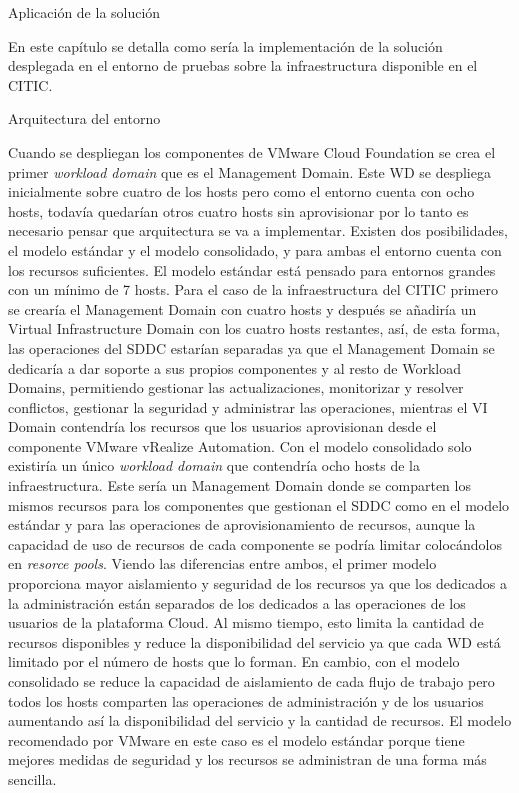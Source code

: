 \begin{chapter}{Aplicación de la solución}

En este capítulo se detalla como sería la implementación de la solución desplegada en el entorno de pruebas sobre la infraestructura disponible en el CITIC.

\begin{section}{Arquitectura del entorno}

Cuando se despliegan los componentes de VMware Cloud Foundation se crea el primer \textit{workload domain} que es el Management Domain. Este WD se despliega inicialmente sobre cuatro de los hosts pero como el entorno cuenta con ocho hosts, todavía quedarían otros cuatro hosts sin aprovisionar por lo tanto es necesario pensar que arquitectura se va a implementar. Existen dos posibilidades, el modelo estándar y el modelo consolidado, y para ambas el entorno cuenta con los recursos suficientes.
El modelo estándar está pensado para entornos grandes con un mínimo de 7 hosts. Para el caso de la infraestructura del CITIC primero se crearía el Management Domain con cuatro hosts y después se añadiría un Virtual Infrastructure Domain con los cuatro hosts restantes, así, de esta forma, las operaciones del SDDC estarían separadas ya que el Management Domain se dedicaría a dar soporte a sus propios componentes y al resto de Workload Domains, permitiendo gestionar las actualizaciones, monitorizar y resolver conflictos, gestionar la seguridad y administrar las operaciones, mientras el VI Domain contendría los recursos que los usuarios aprovisionan desde el componente VMware vRealize Automation.
Con el modelo consolidado solo existiría un único \textit{workload domain} que contendría ocho hosts de la infraestructura. Este sería un Management Domain donde se comparten los mismos recursos para los componentes que gestionan el SDDC como en el modelo estándar y para las operaciones de aprovisionamiento de recursos, aunque la capacidad de uso de recursos de cada componente se podría limitar colocándolos en \textit{resorce pools}.
Viendo las diferencias entre ambos, el primer modelo proporciona mayor aislamiento y seguridad de los recursos ya que los dedicados a la administración están separados de los dedicados a las operaciones de los usuarios de la plataforma Cloud. Al mismo tiempo, esto limita la cantidad de recursos disponibles y reduce la disponibilidad del servicio ya que cada WD está limitado por el número de hosts que lo forman. En cambio, con el modelo consolidado se reduce la capacidad de aislamiento de cada flujo de trabajo pero todos los hosts comparten las operaciones de administración y de los usuarios aumentando así la disponibilidad del servicio y la cantidad de recursos. El modelo recomendado por VMware en este caso es el modelo estándar porque tiene mejores medidas de seguridad y los recursos se administran de una forma más sencilla. 

\end{section}
\end{chapter}
